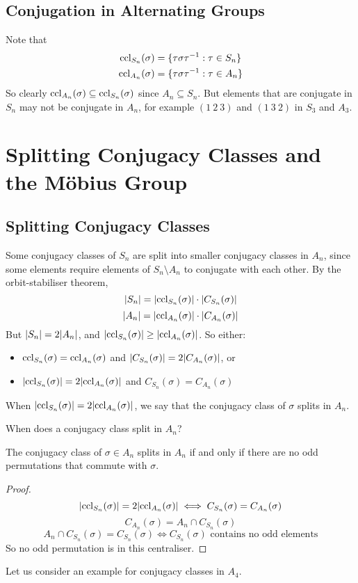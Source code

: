 \documentclass{article}
\begin{document}
\subsection{Conjugation in Alternating Groups}
Note that
\begin{align*}
	\operatorname{ccl}_{S_n}(\sigma) & = \{ \tau \sigma \tau^{-1} : \tau \in S_n \} \\
	\operatorname{ccl}_{A_n}(\sigma) & = \{ \tau \sigma \tau^{-1} : \tau \in A_n \}
\end{align*}
So clearly $\operatorname{ccl}_{A_n}(\sigma) \subseteq \operatorname{ccl}_{S_n}(\sigma)$ since $A_n \subseteq S_n$. But elements that are conjugate in $S_n$ may not be conjugate in $A_n$, for example $(1\ 2\ 3)$ and $(1\ 3\ 2)$ in $S_3$ and $A_3$.

\section{Splitting Conjugacy Classes and the M\"obius Group}
\subsection{Splitting Conjugacy Classes}
Some conjugacy classes of $S_n$ are split into smaller conjugacy classes in $A_n$, since some elements require elements of $S_n \setminus A_n$ to conjugate with each other. By the orbit-stabiliser theorem,
\[ \abs{S_n} = \abs{\operatorname{ccl}_{S_n}(\sigma)} \cdot \abs{C_{S_n}(\sigma)} \]
\[ \abs{A_n} = \abs{\operatorname{ccl}_{A_n}(\sigma)} \cdot \abs{C_{A_n}(\sigma)} \]
But $\abs{S_n} = 2\abs{A_n}$, and $\abs{\operatorname{ccl}_{S_n}(\sigma)} \geq \abs{\operatorname{ccl}_{A_n}(\sigma)}$. So either:
\begin{itemize}
	\item $\operatorname{ccl}_{S_n}(\sigma) = \operatorname{ccl}_{A_n}(\sigma)$ and $\abs{C_{S_n}(\sigma)} = 2\abs{C_{A_n}(\sigma)}$, or
	\item $\abs{\operatorname{ccl}_{S_n}(\sigma)} = 2 \abs{\operatorname{ccl}_{A_n}(\sigma)}$ and $C_{S_n}(\sigma) = C_{A_n}(\sigma)$
\end{itemize}
\begin{definition}
	When $\abs{\operatorname{ccl}_{S_n}(\sigma)} = 2 \abs{\operatorname{ccl}_{A_n}(\sigma)}$, we say that the conjugacy class of $\sigma$ splits in $A_n$.
\end{definition}
When does a conjugacy class split in $A_n$?
\begin{proposition}
	The conjugacy class of $\sigma \in A_n$ splits in $A_n$ if and only if there are no odd permutations that commute with $\sigma$.
\end{proposition}
\begin{proof}
	\[ \abs{\operatorname{ccl}_{S_n}(\sigma)} = 2 \abs{\operatorname{ccl}_{A_n}(\sigma)} \iff C_{S_n}(\sigma) = C_{A_n}(\sigma) \]
	\[ C_{A_n}(\sigma) = A_n \cap C_{S_n}(\sigma) \]
	\[ A_n \cap C_{S_n}(\sigma) = C_{S_n}(\sigma) \iff C_{S_n}(\sigma)\text{ contains no odd elements} \]
	So no odd permutation is in this centraliser.
\end{proof}
Let us consider an example for conjugacy classes in $A_4$.\medskip
\end{document}
